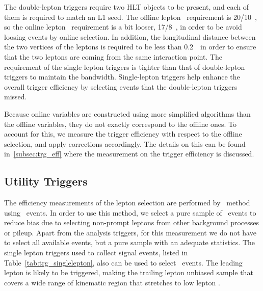 The double-lepton triggers require two HLT objects to be present, 
and each of them is required to match an L1 seed. The offline lepton \pt\ 
requirement is 20/10~\GeV, so the online lepton \pt\ requirement is a bit looser, 17/8~\GeV, 
in order to be avoid loosing events by online selection. In addition,
the longitudinal distance between the two vertices of the leptons is required 
to be less than 0.2~\cm\ in order to ensure that the two leptons are 
coming from the same interaction point. The requirement of the single lepton triggers 
is tighter than that of double-lepton triggers to maintain the bandwidth. 
Single-lepton triggers help enhance the overall trigger efficiency 
by selecting events that the double-lepton triggers missed. 

Because online variables are constructed using more simplified algorithms 
than the offline variables, they do not exactly correspond to the offline ones. 
To account for this, we measure the trigger efficiency with respect to the 
offline selection, and apply corrections accordingly. 
The details on this can be found in~\ref{subsec:trg_eff} where the 
measurement on the trigger efficiency is discussed.


\subsection{Utility Triggers}

The efficiency measurements of the lepton selection  
are performed by \tnp\ method~\cite{Abulencia:2005ix} using \dyll\ events. 
In order to use this method, we select a pure sample 
of \dyll\ events to reduce bias due to selecting non-prompt leptons from 
other background processes or pileup. Apart from the analysis triggers, for this 
measurement we do not have to select all available events, but a pure sample with 
an adequate statistics. The single lepton triggers used to collect signal events, 
listed in Table~\ref{tab:trg_singlelepton}, also can be used to select 
\dyll\ events. The leading lepton is likely to be triggered, making the 
trailing lepton unbiased sample that covers a wide range of 
kinematic region that stretches to low lepton \pt.   

